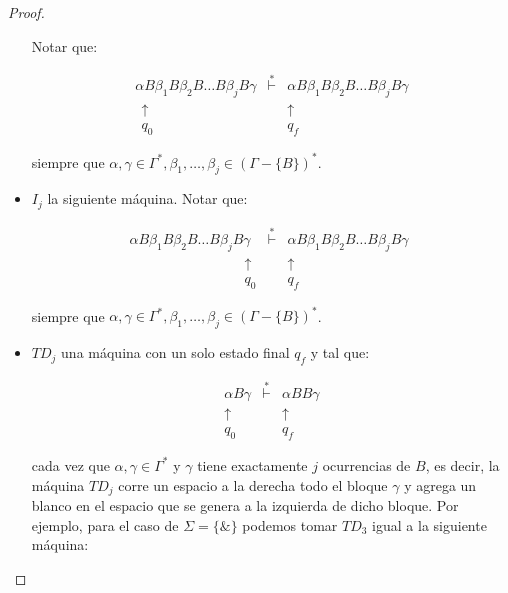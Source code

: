 \begin{proof}
\begin{itemize}
        \PN Notar que:

    		\[
    		  \begin{array}{lcr}
            \alpha B \beta_{1} B \beta_{2} B \dotsc B \beta_{j} B \gamma &\overset{\ast}{\vdash}& \alpha B \beta_{1} B
              \beta_{2} B \dotsc B \beta_{j} B \gamma \\
            \ \ \uparrow && \uparrow \ \ \\
            \ \ q_{0} && q_{f} \ \
          \end{array}
    		\]

        \PN siempre que $\alpha, \gamma \in \Gamma ^{\ast}, \beta_{1}, \dotsc, \beta_{j} \in (\Gamma -\{B\})^{\ast}$.

      \item $I_{j}$ la siguiente máquina. Notar que:

    		\[
    		  \begin{array}{lcr}
            \alpha B \beta_{1} B
            \beta_{2} B \dotsc B \beta_{j} B \gamma &\overset{\ast}{\vdash}&  \alpha B \beta_{1} B \beta_{2} B \dotsc B
            \beta_{j} B \gamma \\
            \qquad\qquad\qquad\qquad \ \uparrow && \uparrow \qquad\qquad\qquad\qquad \ \\
            \qquad\qquad\qquad\qquad \ q_{0} && q_{f} \qquad\qquad\qquad\qquad \
          \end{array}
    		\]

        \PN siempre que $\alpha, \gamma \in \Gamma ^{\ast}, \beta_{1}, \dotsc, \beta_{j} \in (\Gamma -\{B\})^{\ast}$.

      \item $TD_{j}$ una máquina con un solo estado final $q_{f}$ y tal que:

    		\[
          \begin{array}{ccc}
            \alpha B \gamma &\overset{\ast}{\vdash} &\alpha B B \gamma \\
            \uparrow && \uparrow \ \ \\
            q_{0} & & q_{f} \ \
          \end{array}
        \]

        \PN cada vez que $\alpha, \gamma \in \Gamma^{\ast}$ y $\gamma$ tiene exactamente $j$ ocurrencias de $B$, es
        decir, la máquina $TD_{j}$ corre un espacio a la derecha todo el bloque $\gamma$ y agrega un blanco en el
        espacio que se genera a la izquierda de dicho bloque. Por ejemplo, para el caso de $\Sigma =\{\&\}$ podemos
        tomar $TD_{3}$ igual a la siguiente máquina:


\end{itemize}
\end{proof}
